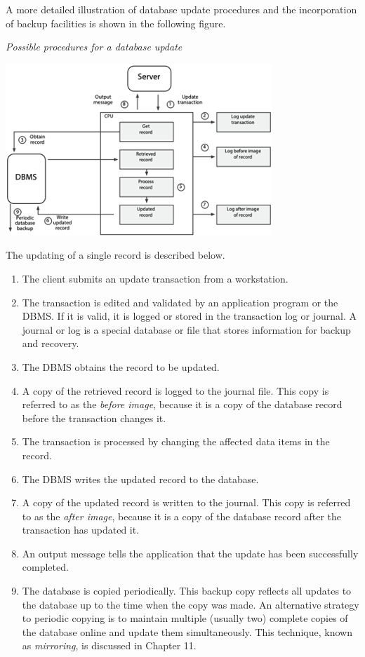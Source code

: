 \documentclass[
]{article}
\begin{document}
A more detailed illustration of database update procedures and the
incorporation of backup facilities is shown in the following figure.

\emph{Possible procedures for a database update}

\includegraphics{Figures/Chapter 23/procedures.png}

The updating of a single record is described below.

\begin{enumerate}
\def\labelenumi{\arabic{enumi}.}
\item
  The client submits an update transaction from a workstation.
\item
  The transaction is edited and validated by an application program or
  the DBMS. If it is valid, it is logged or stored in the transaction
  log or journal. A journal or log is a special database or file that
  stores information for backup and recovery.
\item
  The DBMS obtains the record to be updated.
\item
  A copy of the retrieved record is logged to the journal file. This
  copy is referred to as the \emph{before image}, because it is a copy of
  the database record before the transaction changes it.
\item
  The transaction is processed by changing the affected data items in
  the record.
\item
  The DBMS writes the updated record to the database.
\item
  A copy of the updated record is written to the journal. This copy is
  referred to as the \emph{after image}, because it is a copy of the
  database record after the transaction has updated it.
\item
  An output message tells the application that the update has been
  successfully completed.
\item
  The database is copied periodically. This backup copy reflects all
  updates to the database up to the time when the copy was made. An
  alternative strategy to periodic copying is to maintain multiple
  (usually two) complete copies of the database online and update them
  simultaneously. This technique, known as \emph{mirroring}, is discussed
  in Chapter 11.
\end{enumerate}
\end{document}
